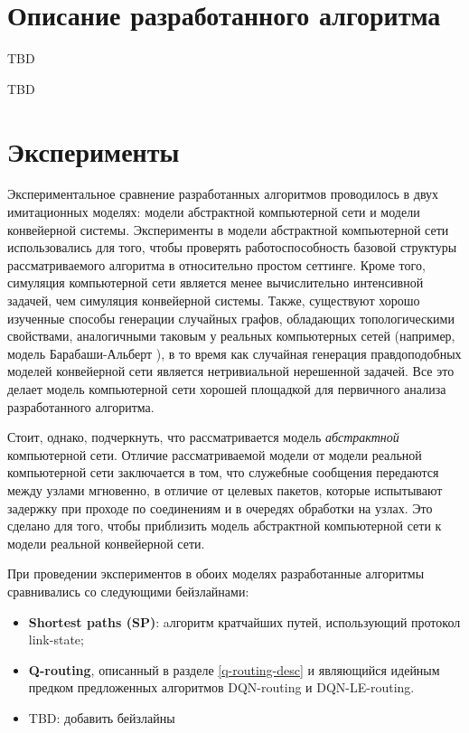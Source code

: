 \documentclass[specification,annotation,times]{itmo-student-thesis}
\theoremstyle{definition}
\begin{document}
\chapter{Описание разработанного алгоритма}

TBD

\chapterconclusion

TBD

\chapter{Эксперименты}\label{experiments}

Экспериментальное сравнение разработанных алгоритмов проводилось в двух
имитационных моделях: модели абстрактной компьютерной сети и модели конвейерной
системы. Эксперименты в модели абстрактной компьютерной сети использовались для
того, чтобы проверять работоспособность базовой структуры рассматриваемого
алгоритма в относительно простом сеттинге. Кроме того, симуляция компьютерной
сети является менее вычислительно интенсивной задачей, чем симуляция конвейерной
системы. Также, существуют хорошо изученные способы генерации случайных графов,
обладающих топологическими свойствами, аналогичными таковым у реальных
компьютерных сетей (например, модель Барабаши-Альберт
\cite{albert2002statistical}), в то время как случайная генерация правдоподобных
моделей конвейерной сети является нетривиальной нерешенной задачей. Все это
делает модель компьютерной сети хорошей площадкой для первичного анализа
разработанного алгоритма.

Стоит, однако, подчеркнуть, что рассматривается модель \textit{абстрактной}
компьютерной сети. Отличие рассматриваемой модели от модели реальной
компьютерной сети заключается в том, что служебные сообщения передаются между
узлами мгновенно, в отличие от целевых пакетов, которые испытывают задержку при
проходе по соединениям и в очередях обработки на узлах. Это сделано для того,
чтобы приблизить модель абстрактной компьютерной сети к модели реальной
конвейерной сети.

При проведении экспериментов в обоих моделях разработанные алгоритмы
сравнивались со следующими бейзлайнами:
\begin{itemize}
  \item \textbf{Shortest paths (SP)}: aлгоритм кратчайших путей, использующий протокол link-state; 
  \item \textbf{Q-routing}, описанный в разделе \ref{q-routing-desc} и
    являющийся идейным предком предложенных алгоритмов DQN-routing и DQN-LE-routing.
  \item TBD: добавить бейзлайны
\end{itemize}
\end{document}
